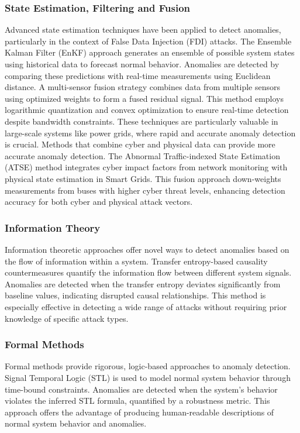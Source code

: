 \subsubsection{State Estimation, Filtering and Fusion}

Advanced state estimation techniques have been applied to detect anomalies, particularly in the context of False Data Injection (FDI) attacks. The Ensemble Kalman Filter (EnKF) approach \cite{72} generates an ensemble of possible system states using historical data to forecast normal behavior. Anomalies are detected by comparing these predictions with real-time measurements using Euclidean distance. A multi-sensor fusion strategy \cite{53} combines data from multiple sensors using optimized weights to form a fused residual signal. This method employs logarithmic quantization and convex optimization to ensure real-time detection despite bandwidth constraints. These techniques are particularly valuable in large-scale systems like power grids, where rapid and accurate anomaly detection is crucial. Methods that combine cyber and physical data can provide more accurate anomaly detection. The Abnormal Traffic-indexed State Estimation (ATSE) method \cite{95} integrates cyber impact factors from network monitoring with physical state estimation in Smart Grids. This fusion approach down-weights measurements from buses with higher cyber threat levels, enhancing detection accuracy for both cyber and physical attack vectors.

\subsubsection{Information Theory}

Information theoretic approaches offer novel ways to detect anomalies based on the flow of information within a system. Transfer entropy-based causality countermeasures \cite{69} quantify the information flow between different system signals. Anomalies are detected when the transfer entropy deviates significantly from baseline values, indicating disrupted causal relationships. This method is especially effective in detecting a wide range of attacks without requiring prior knowledge of specific attack types.

\subsubsection{Formal Methods}

Formal methods provide rigorous, logic-based approaches to anomaly detection. Signal Temporal Logic (STL) \cite{19} is used to model normal system behavior through time-bound constraints. Anomalies are detected when the system's behavior violates the inferred STL formula, quantified by a robustness metric. This approach offers the advantage of producing human-readable descriptions of normal system behavior and anomalies.

